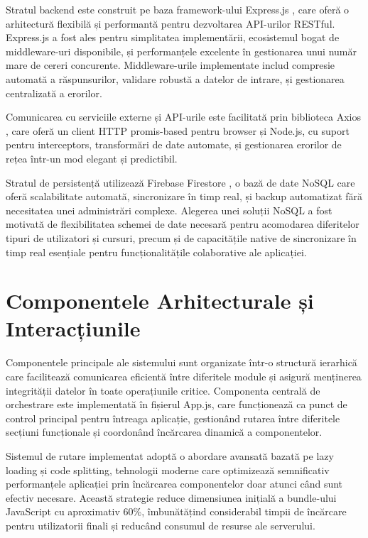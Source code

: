 \documentclass[12pt,a4paper]{report}
\begin{document}
Stratul backend este construit pe baza framework-ului Express.js \cite{expressjs}, care oferă o arhitectură flexibilă și performantă pentru dezvoltarea API-urilor RESTful. Express.js a fost ales pentru simplitatea implementării, ecosistemul bogat de middleware-uri disponibile, și performanțele excelente în gestionarea unui număr mare de cereri concurente. Middleware-urile implementate includ compresie automată a răspunsurilor, validare robustă a datelor de intrare, și gestionarea centralizată a erorilor.

Comunicarea cu serviciile externe și API-urile este facilitată prin biblioteca Axios \cite{axios}, care oferă un client HTTP promis-based pentru browser și Node.js, cu suport pentru interceptors, transformări de date automate, și gestionarea erorilor de rețea într-un mod elegant și predictibil.

Stratul de persistență utilizează Firebase Firestore \cite{firebase}, o bază de date NoSQL 
care oferă scalabilitate automată, sincronizare în timp real, și backup automatizat fără necesitatea unei administrări complexe. Alegerea unei soluții NoSQL a fost motivată de flexibilitatea schemei de date necesară pentru acomodarea diferitelor tipuri de utilizatori și cursuri, precum și de capacitățile native de sincronizare în timp real esențiale pentru funcționalitățile colaborative ale aplicației.

\section{Componentele Arhitecturale și Interacțiunile}

Componentele principale ale sistemului sunt organizate într-o structură ierarhică care facilitează comunicarea eficientă între diferitele module și asigură menținerea integrității datelor în toate operațiunile critice. Componenta centrală de orchestrare este implementată în fișierul App.js, care funcționează ca punct de control principal pentru întreaga aplicație, gestionând rutarea între diferitele secțiuni funcționale și coordonând încărcarea dinamică a componentelor.

Sistemul de rutare implementat \cite{react-router} adoptă o abordare avansată bazată pe lazy loading și code splitting, tehnologii moderne care optimizează semnificativ performanțele aplicației prin încărcarea componentelor doar atunci când sunt efectiv necesare. Această strategie reduce dimensiunea inițială a bundle-ului JavaScript cu aproximativ 60\%, îmbunătățind considerabil timpii de încărcare pentru utilizatorii finali și reducând consumul de resurse ale serverului.
\end{document}
